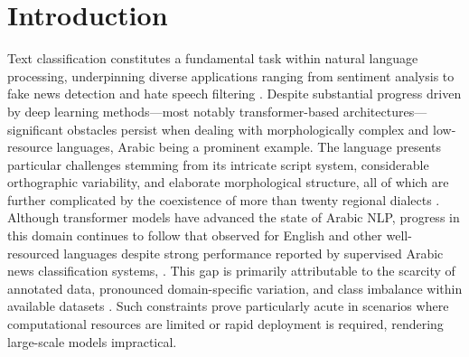 \documentclass[preprint,12pt,authoryear]{elsarticle}
\begin{document}







\section{Introduction}
\label{intro}

Text classification constitutes a fundamental task within natural language processing, underpinning diverse applications ranging from sentiment analysis \cite{elnagar2021sentiment,bensoltane2022towards,bentrcia2025hybrid} to fake news detection \cite{nassif2022arabic} and hate speech filtering \cite{elgendy2024toxicity, torfa2025enhancing}. Despite substantial progress driven by deep learning methods—most notably transformer-based architectures—significant obstacles persist when dealing with morphologically complex and low-resource languages, Arabic being a prominent example. The language presents particular challenges stemming from its intricate script system, considerable orthographic variability, and elaborate morphological structure, all of which are further complicated by the coexistence of more than twenty regional dialects \cite{helwe2020semi, talafha2020multi}. Although transformer models have advanced the state of Arabic NLP, progress in this domain continues to follow that observed for English and other well-resourced languages
despite strong performance reported by supervised Arabic news classification systems, \cite{al2019arabic,elnagar2020arabic}. This gap is primarily attributable to the scarcity of annotated data, pronounced domain-specific variation, and class imbalance within available datasets \cite{alhawarat2020superior, almuzaini2020impact}. Such constraints prove particularly acute in scenarios where computational resources are limited or rapid deployment is required, rendering large-scale models impractical.
\end{document}

